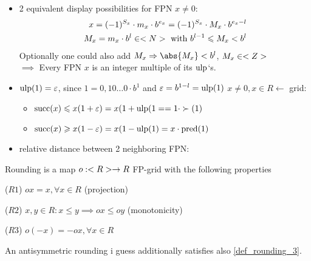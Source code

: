 \begin{itemize}
    \item 2 equivalent display possibilities for FPN $x\neq 0:$
    \begin{align*}
    	x=(-1)^{S_x}\cdot m_x\cdot b^{e_x}=(-1)^{S_x}\cdot M_x\cdot b^{e_x-l}\\
        M_x=m_x\cdot b^l \in <N> \text{ with } b^{l-1}\leqslant M_x<b^l
    \end{align*}
    Optionally one could also add $M_x \implies \abs{M_x}<b^l$, $M_x\in <Z>$\\
    $\implies$ Every FPN $x$ is an integer multiple of its $\operatorname{ulp}$`s.
    \item $\operatorname{ulp}(1)=\varepsilon$, since $1=0,10\dots0\cdot b^1$ and $\varepsilon=b^{1-l}=\operatorname{ulp}(1)$ $x\not =0, x\in R \leftarrow$ grid: 
    \begin{itemize}
        \item $\operatorname{succ}(x)\leqslant x(1+\varepsilon)=x(1+\operatorname{ulp}(1= = 1\cdot \succ(1)$
        \item $\operatorname{succ}(x)\geqslant x(1-\varepsilon)=x(1-\operatorname{ulp}(1)=x\cdot \operatorname{pred}(1)$
    \end{itemize}
    \item relative distance between 2 neighboring FPN:
   \end{itemize}
    \begin{definition}[Rounding]
    	Rounding is a map $o:<R>\to R $ FP-grid with the following properties
    	\begin{defenum}
    		\item ($R1$) $ox=x, \forall x\in R$ (projection) \label{def_rounding_1}
    		\item ($R2$) $x,y \in R: x\leqslant y \implies ox\leqslant oy$ (monotonicity) \label{def_rounding_2}
    		\item ($R3$) $o(-x)=-ox, \forall x\in R$ \label{def_rounding_3}
    	\end{defenum}
    \end{definition}
	\begin{remark}
		An antisymmetric rounding i guess additionally satisfies also \ref{def_rounding_3}.
	\end{remark}
